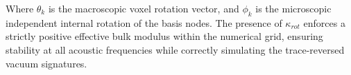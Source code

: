 Where $\theta_k$ is the macroscopic voxel rotation vector, and $\phi_k$ is the microscopic independent internal rotation of the basis nodes. The presence of $\kappa_{rot}$ enforces a strictly positive effective bulk modulus within the numerical grid, ensuring stability at all acoustic frequencies while correctly simulating the trace-reversed vacuum signatures.

